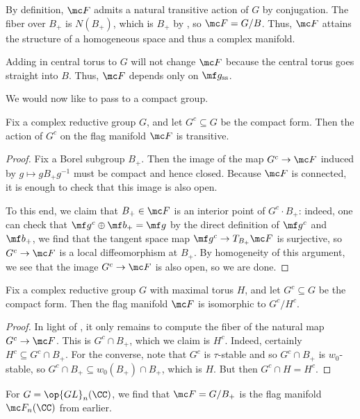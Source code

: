 \documentclass[../notes.tex]{subfiles}
\begin{document}
\begin{remark}
	By definition, $\mc F$ admits a natural transitive action of $G$ by conjugation. The fiber over $B_+$ is $N(B_+)$, which is $B_+$ by , so $\mc F=G/B$. Thus, $\mc F$ attains the structure of a homogeneous space and thus a complex manifold.
\end{remark}
\begin{remark}
	Adding in central torus to $G$ will not change $\mc F$ because the central torus goes straight into $B$. Thus, $\mc F$ depends only on $\mf g_{\mathrm{ss}}$.
\end{remark}
We would now like to pass to a compact group.
\begin{lemma} \label{lem:compact-on-flag}
	Fix a complex reductive group $G$, and let $G^c\subseteq G$ be the compact form. Then the action of $G^c$ on the flag manifold $\mc F$ is transitive.
\end{lemma}
\begin{proof}
	Fix a Borel subgroup $B_+$. Then the image of the map $G^c\to\mc F$ induced by $g\mapsto gB_+g^{-1}$ must be compact and hence closed. Because $\mc F$ is connected, it is enough to check that this image is also open.
	
	To this end, we claim that $B_+\in\mc F$ is an interior point of $G^c\cdot B_+$: indeed, one can check that $\mf g^c\oplus\mf b_+=\mf g$ by the direct definition of $\mf g^c$ and $\mf b_+$, we find that the tangent space map $\mf g^c\to T_{B_+}\mc F$ is surjective, so $G^c\to\mc F$ is a local diffeomorphism at $B_+$. By homogeneity of this argument, we see that the image $G^c\to\mc F$ is also open, so we are done.
\end{proof}
\begin{proposition} \label{prop:flag-as-compact}
	Fix a complex reductive group $G$ with maximal torus $H$, and let $G^c\subseteq G$ be the compact form. Then the flag manifold $\mc F$ is isomorphic to $G^c/H^c$.
\end{proposition}
\begin{proof}
	In light of , it only remains to compute the fiber of the natural map $G^c\to\mc F$. This is $G^c\cap B_+$, which we claim is $H^c$. Indeed, certainly $H^c\subseteq G^c\cap B_+$. For the converse, note that $G^c$ is $\tau$-stable and so $G^c\cap B_+$ is $w_0$-stable, so $G^c\cap B_+\subseteq w_0(B_+)\cap B_+$, which is $H$. But then $G^c\cap H=H^c$.
\end{proof}
\begin{example}
	For $G=\op{GL}_n(\CC)$, we find that $\mc F=G/B_+$ is the flag manifold $\mc F_n(\CC)$ from earlier.
\end{example}
\end{document}
